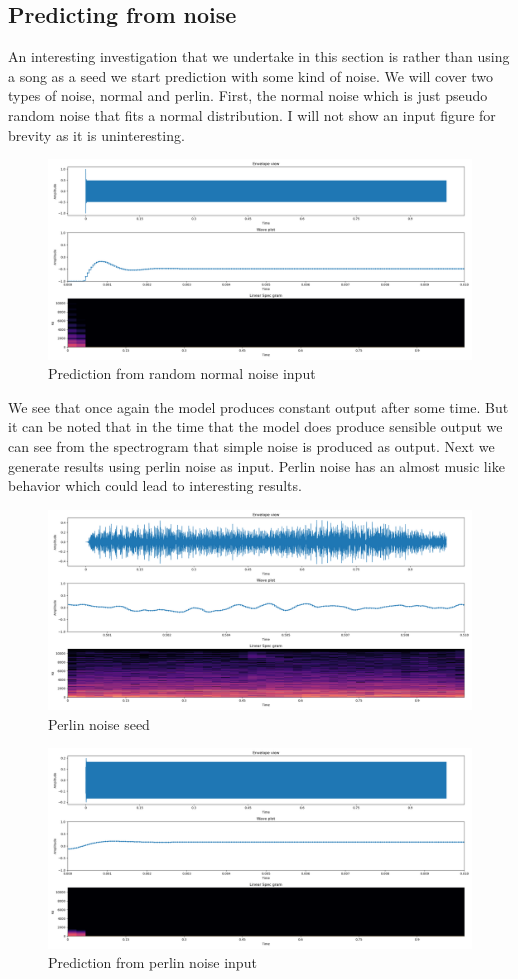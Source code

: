 \documentclass{article}
\begin{document}
\subsection{Predicting from noise}
An interesting investigation that we undertake in this section is rather than using a song as a seed we start prediction with some kind of noise. We will cover two types of noise, normal and perlin. First, the normal noise which is just pseudo random noise that fits a normal distribution. I will not show an input figure for brevity as it is uninteresting. 
\begin{figure}[H]
\caption{Prediction from random normal noise input}
\includegraphics[scale=0.35]{random_normal_prediction.png}
\end{figure}
We see that once again the model produces constant output after some time. But it can be noted that in the time that the model does produce sensible output we can see from the spectrogram that simple noise is produced as output. 
Next we generate results using perlin noise as input. Perlin noise has an almost music like behavior which could lead to interesting results. 
\begin{figure}[H]
\caption{Perlin noise seed}
\includegraphics[scale=0.35]{perlin_seed.png}
\end{figure}
\begin{figure}[H]
\caption{Prediction from perlin noise input}
\includegraphics[scale=0.35]{perlin_prediction.png}
\end{figure}
\end{document}
